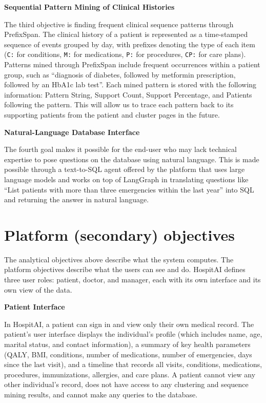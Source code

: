 \vspace{0.5em}
\noindent\textbf{Sequential Pattern Mining of Clinical Histories}

The third objective is finding frequent clinical sequence patterns through PrefixSpan. The clinical history of a patient is represented as a time-stamped sequence of events grouped by day, with prefixes denoting the type of each item (\texttt{C:} for conditions, \texttt{M:} for medications, \texttt{P:} for procedures, \texttt{CP:} for care plans). Patterns mined through PrefixSpan include frequent occurrences within a patient group, such as “diagnosis of diabetes, followed by metformin prescription, followed by an HbA1c lab test”. Each mined pattern is stored with the following information: Pattern String, Support Count, Support Percentage, and Patients following the pattern. This will allow us to trace each pattern back to its supporting patients from the patient and cluster pages in the future.

\vspace{0.5em}
\noindent\textbf{Natural-Language Database Interface}

The fourth goal makes it possible for the end-user who may lack technical expertise to pose questions on the database using natural language. This is made possible through a text-to-SQL agent offered by the platform that uses large language models and works on top of LangGraph in translating questions like “List patients with more than three emergencies within the last year” into SQL and returning the answer in natural language.

\section{Platform (secondary) objectives}

The analytical objectives above describe what the system computes. The platform objectives describe what the users can see and do. HospitAI defines three user roles: patient, doctor, and manager, each with its own interface and its own view of the data.

\vspace{0.5em}
\noindent\textbf{Patient Interface}

In HospitAI, a patient can sign in and view only their own medical record. The patient's user interface displays the individual’s profile (which includes name, age, marital status, and contact information), a summary of key health parameters (QALY, BMI, conditions, number of medications, number of emergencies, days since the last visit), and a timeline that records all visits, conditions, medications, procedures, immunizations, allergies, and care plans. A patient cannot view any other individual's record, does not have access to any clustering and sequence mining results, and cannot make any queries to the database.

